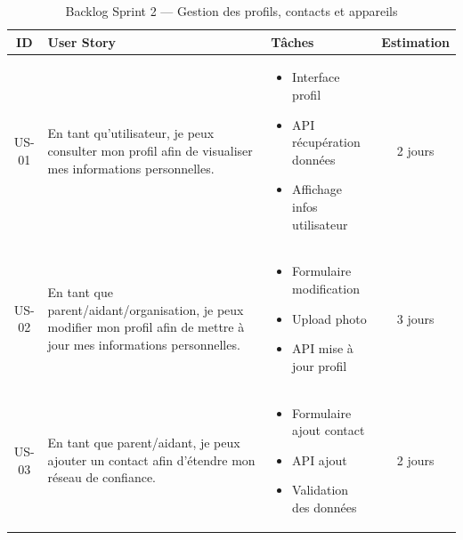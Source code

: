\begin{table}[H]
    \caption{Backlog Sprint 2 — Gestion des profils, contacts et appareils}
\centering
\small
\setlength{\tabcolsep}{3pt}
\renewcommand{\arraystretch}{1.0}
\setlength{\parskip}{0pt}
\begin{tabularx}{\textwidth}{|c|>{\raggedright\arraybackslash}X|>{\raggedright\arraybackslash}X|c|}
\hline
\textbf{ID} & \textbf{User Story} & \textbf{Tâches} & \textbf{Estimation} \\
\hline

US-01 & En tant qu'utilisateur, je peux consulter mon profil afin de visualiser mes informations personnelles.
& \begin{minipage}[t]{\linewidth}\setlength{\itemsep}{-2pt}
\begin{itemize}[leftmargin=*]
\item Interface profil
\item API récupération données
\item Affichage infos utilisateur
\end{itemize}
\end{minipage}
& 2 jours \\
\hline

US-02 & En tant que parent/aidant/organisation, je peux modifier mon profil afin de mettre à jour mes informations personnelles.
& \begin{minipage}[t]{\linewidth}\setlength{\itemsep}{-2pt}
\begin{itemize}[leftmargin=*]
\item Formulaire modification
\item Upload photo
\item API mise à jour profil
\end{itemize}
\end{minipage}
& 3 jours \\
\hline

US-03 & En tant que parent/aidant, je peux ajouter un contact afin d'étendre mon réseau de confiance.
& \begin{minipage}[t]{\linewidth}\setlength{\itemsep}{-2pt}
\begin{itemize}[leftmargin=*]
\item Formulaire ajout contact
\item API ajout
\item Validation des données
\end{itemize}
\end{minipage}
& 2 jours \\
\hline


\end{tabularx}
\end{table}
